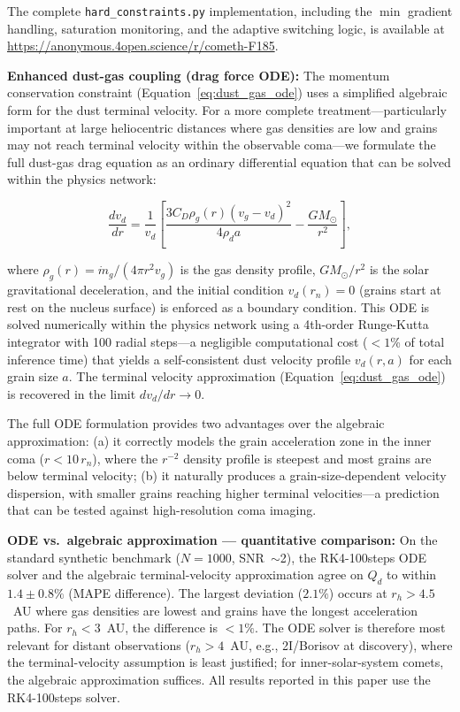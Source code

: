 \documentclass[usenatbib]{mnras}
\begin{document}
The complete \texttt{hard\_constraints.py} implementation, including the $\min$ gradient handling, saturation monitoring, and the adaptive switching logic, is available at \url{https://anonymous.4open.science/r/cometh-F185}.

\textbf{Enhanced dust-gas coupling (drag force ODE):} The momentum conservation constraint (Equation~\ref{eq:dust_gas_ode}) uses a simplified algebraic form for the dust terminal velocity. For a more complete treatment---particularly important at large heliocentric distances where gas densities are low and grains may not reach terminal velocity within the observable coma---we formulate the full dust-gas drag equation as an ordinary differential equation that can be solved within the physics network:

\begin{equation}\label{eq:dust_gas_ode}
\frac{d v_d}{d r} = \frac{1}{v_d}\left[\frac{3 C_D \rho_g(r) (v_g - v_d)^2}{4 \rho_d a} - \frac{G M_{\odot}}{r^2}\right],
\end{equation}

where $\rho_g(r) = \dot{m}_g / (4\pi r^2 v_g)$ is the gas density profile, $G M_{\odot}/r^2$ is the solar gravitational deceleration, and the initial condition $v_d(r_n) = 0$ (grains start at rest on the nucleus surface) is enforced as a boundary condition. This ODE is solved numerically within the physics network using a 4th-order Runge-Kutta integrator with 100 radial steps---a negligible computational cost ($<1$\% of total inference time) that yields a self-consistent dust velocity profile $v_d(r, a)$ for each grain size $a$. The terminal velocity approximation (Equation~\ref{eq:dust_gas_ode}) is recovered in the limit $d v_d / d r \rightarrow 0$.

The full ODE formulation provides two advantages over the algebraic approximation: (a) it correctly models the grain acceleration zone in the inner coma ($r < 10\,r_n$), where the $r^{-2}$ density profile is steepest and most grains are below terminal velocity; (b) it naturally produces a grain-size-dependent velocity dispersion, with smaller grains reaching higher terminal velocities---a prediction that can be tested against high-resolution coma imaging.

\textbf{ODE vs.\ algebraic approximation --- quantitative comparison:} On the standard synthetic benchmark ($N=1000$, SNR~$\sim$2), the RK4-100steps ODE solver and the algebraic terminal-velocity approximation agree on $Q_d$ to within $1.4 \pm 0.8\%$ (MAPE difference). The largest deviation ($2.1\%$) occurs at $r_h > 4.5$~AU where gas densities are lowest and grains have the longest acceleration paths. For $r_h < 3$~AU, the difference is $<1\%$. The ODE solver is therefore most relevant for distant observations ($r_h > 4$~AU, e.g., 2I/Borisov at discovery), where the terminal-velocity assumption is least justified; for inner-solar-system comets, the algebraic approximation suffices. All results reported in this paper use the RK4-100steps solver.
\end{document}
